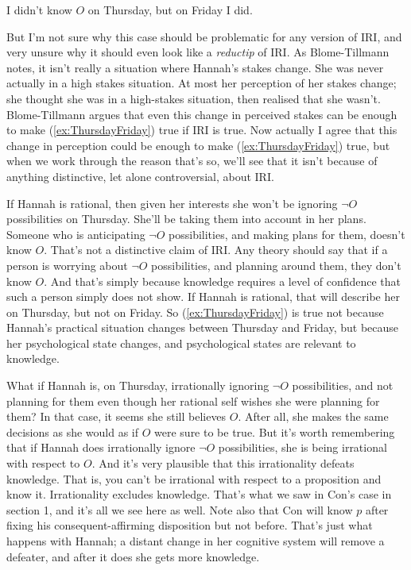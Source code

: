\documentclass[11pt,oneside]{book}
\newcommand{\numbex}[2]{
\begin{enumerate*}
\setcounter{enumi}{\value{paper}}
\renewcommand{\labelenumi}{(\arabic{enumi})}
#2
\end{enumerate*}
\addtocounter{paper}{#1}}
\begin{document}
\numbex{1}{
\item \label{ex:ThursdayFriday} I didn't know \(O\) on Thursday, but on Friday I did.
}

\noindent But I'm not sure why this case should be problematic for any version of IRI, and very unsure why it should even look like a \textit{reductip} of IRI. As Blome-Tillmann notes, it isn't really a situation where Hannah's stakes change. She was never actually in a high stakes situation. At most her perception of her stakes change; she thought she was in a high-stakes situation, then realised that she wasn't. Blome-Tillmann argues that even this change in perceived stakes can be enough to make (\ref{ex:ThursdayFriday}) true if IRI is true. Now actually I agree that this change in perception could be enough to make (\ref{ex:ThursdayFriday}) true, but when we work through the reason that's so, we'll see that it isn't because of anything distinctive, let alone controversial, about IRI.

If Hannah is rational, then given her interests she won't be ignoring \(\neg O\) possibilities on Thursday. She'll be taking them into account in her plans. Someone who is anticipating \(\neg O\) possibilities, and making plans for them, doesn't know \(O\). That's not a distinctive claim of IRI. Any theory should say that if a person is worrying about \(\neg O\) possibilities, and planning around them, they don't know \(O\). And that's simply because knowledge requires a level of confidence that such a person simply does not show. If Hannah is rational, that will describe her on Thursday, but not on Friday. So (\ref{ex:ThursdayFriday}) is true not because Hannah's practical situation changes between Thursday and Friday, but because her psychological state changes, and psychological states are relevant to knowledge.

What if Hannah is, on Thursday, irrationally ignoring \(\neg O\) possibilities, and not planning for them even though her rational self wishes she were planning for them? In that case, it seems she still believes \(O\). After all, she makes the same decisions as she would as if \(O\) were sure to be true. But it's worth remembering that if Hannah does irrationally ignore \(\neg O\) possibilities, she is being irrational with respect to \(O\). And it's very plausible that this irrationality defeats knowledge. That is, you can't be irrational with respect to a proposition and know it. Irrationality excludes knowledge. That's what we saw in Con's case in section 1, and it's all we see here as well. Note also that Con will know $p$ after fixing his consequent-affirming disposition but not before. That's just what happens with Hannah; a distant change in her cognitive system will remove a defeater, and after it does she gets more knowledge.
\end{document}
